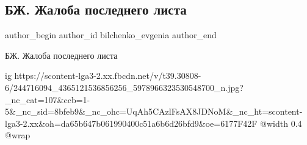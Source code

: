  
 
 
 
 
 
\subsection{БЖ. Жалоба последнего листа}
\label{sec:21_10_2021.fb.bilchenko_evgenia.2.zhaloba_poslednego_lista}
 
\ifcmt
 author_begin
   author_id bilchenko_evgenia
 author_end
\fi

БЖ. Жалоба последнего листа

\ifcmt
  ig https://scontent-lga3-2.xx.fbcdn.net/v/t39.30808-6/244716094_4365121536856256_5978966323530548700_n.jpg?_nc_cat=107&ccb=1-5&_nc_sid=8bfeb9&_nc_ohc=UqAh5CAzlFsAX8JDNoM&_nc_ht=scontent-lga3-2.xx&oh=da65b647b061990400c51a6b6d26bfd9&oe=6177F42F
  @width 0.4
  @wrap 
\fi

